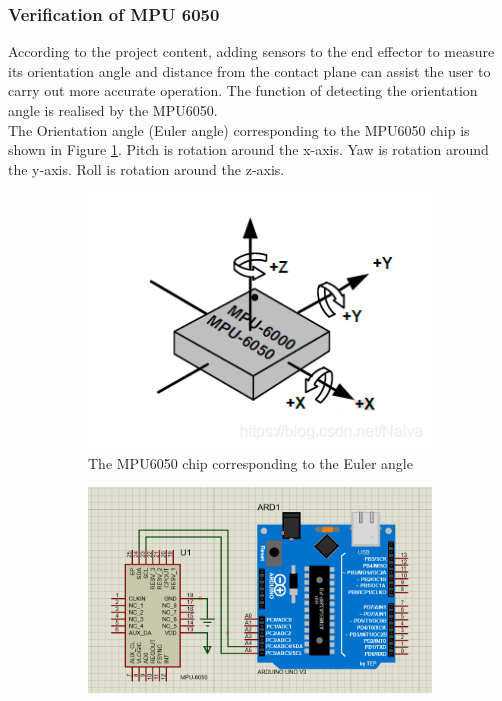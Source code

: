 \subsubsection{Verification of MPU 6050}
According to the project content, adding sensors to the end effector to measure its orientation angle and distance 
from the contact plane can assist the user to carry out more accurate operation. The function of detecting the 
orientation angle is realised by the MPU6050. \\
The Orientation angle (Euler angle) corresponding to the MPU6050 chip is shown in Figure \ref{fig:mpu6050_chip}. 
Pitch is rotation around the x-axis. Yaw is rotation around the y-axis. Roll is rotation around the z-axis. 
\begin{figure}[H] %
    \centering %
    \captionsetup{labelsep=colon}
    \begin{subfigure}{0.45\textwidth} %
        \centering
        \includegraphics[width=\linewidth]{Image/Design/MPU6050_chip.png}
        \caption{\centering The MPU6050 chip corresponding to the Euler angle}
        \label{fig:mpu6050_chip}
    \end{subfigure}
    \begin{subfigure}{0.45\textwidth} %
        \centering
        \includegraphics[width=\linewidth]{Image/Design/MPU6050_circuit.png}

\end{subfigure}
\end{figure}
